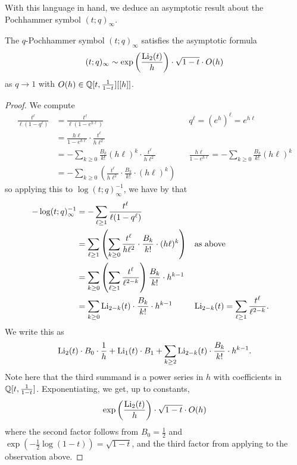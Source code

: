With this language in hand, we deduce an asymptotic result about the Pochhammer symbol $(t;q)_{\infty}$. 
\begin{proposition}\label{prop: asymptotics q t Pochhammer at 1}
    The $q$-Pochhammer symbol $(t;q)_{\infty}$ satisfies the asymptotic formula
    \begin{equation}\label{eqn: asymptotics of q t Pochhammer at 1}
        (t;q)_{\infty}\sim\exp\left(\frac{\mathrm{Li}_{2}(t)}{h}\right)\cdot\sqrt{1-t}\cdot O(h)
    \end{equation}
    as $q\to 1$ with $O(h)\in\mathbb{Q}[t,\frac{1}{1-t}][[h]]$. 
\end{proposition}
\begin{proof}
    We compute 
    \begin{align*}
        \frac{t^{\ell}}{\ell(1-q^{\ell})} &= \frac{t^{\ell}}{\ell(1-e^{h\ell})} && q^{\ell}=(e^{h})^{\ell}=e^{h\ell}\\
        &= \frac{h\ell}{1-e^{h\ell}}\cdot\frac{t^{\ell}}{h\ell^{2}} \\
        &= -\sum_{k\geq0}\frac{B_{k}}{k!}(h\ell)^{k}\cdot\frac{t^{\ell}}{h\ell^{2}} && \frac{h\ell}{1-e^{h\ell}}=-\sum_{k\geq0}\frac{B_{k}}{k!}(h\ell)^{k} \\
        &= -\sum_{k\geq0}\left(\frac{t^{\ell}}{h\ell^{2}}\cdot\frac{B_{k}}{k!}\cdot(h\ell)^{k}\right)
    \end{align*}
    so applying this to $\log(t;q)_{\infty}^{-1}$, we have by  that
    \begin{align*}
        -\log(t;q)_{\infty}^{-1} &= -\sum_{\ell\geq1}\frac{t^{\ell}}{\ell(1-q^{\ell})} \\ 
        &= \sum_{\ell\geq1}\left(\sum_{k\geq0}\frac{t^{\ell}}{h\ell^{2}}\cdot\frac{B_{k}}{k!}\cdot(h\ell)^{k}\right)&& \text{as above} \\
        &= \sum_{k\geq0}\left(\sum_{\ell\geq1}\frac{t^{\ell}}{\ell^{2-k}}\right)\frac{B_{k}}{k!}\cdot h^{k-1} && \\
        &= \sum_{k\geq0}\mathrm{Li}_{2-k}(t)\cdot\frac{B_{k}}{k!}\cdot h^{k-1} && \mathrm{Li}_{2-k}(t)=\sum_{\ell\geq1}\frac{t^{\ell}}{\ell^{2-k}}.
    \end{align*}
    We write this as 
    $$\mathrm{Li}_{2}(t)\cdot B_{0}\cdot\frac{1}{h} + \mathrm{Li}_{1}(t)\cdot B_{1}+\sum_{k\geq2}\mathrm{Li}_{2-k}(t)\cdot\frac{B_{k}}{k!}\cdot h^{k-1}.$$
    Note here that the third summand is a power series in $h$ with coefficients in $\mathbb{Q}[t,\frac{1}{1-t}]$. Exponentiating, we get, up to constants, 
    $$\exp\left(\frac{\mathrm{Li}_{2}(t)}{h}\right)\cdot\sqrt{1-t}\cdot O(h)$$
    where the second factor follows from $B_{0}=\frac{1}{2}$ and $\exp(-\frac{1}{2}\log(1-t))=\sqrt{1-t}$, and the third factor from applying  to the observation above. 
\end{proof}
